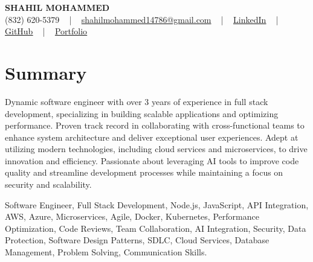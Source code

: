 \documentclass[letterpaper,10pt]{article}
\begin{document}
\begin{center}
    {\fontsize{14pt}{12pt}\selectfont \textbf{\MakeUppercase{Shahil Mohammed}}}\\ \vspace{2pt}
    \fontsize{10pt}{12pt}\selectfont (832) 620-5379 ~ | ~ \href{mailto:shahilmohammed14786@gmail.com}{shahilmohammed14786@gmail.com} ~ | ~  
    \href{https://www.linkedin.com/in/shahil-mohammed-9652931a1/}{\color{blue}\underline{LinkedIn}}  ~ | ~ 
    \href{https://github.com/freakbeast14}{\color{blue}\underline{GitHub}} ~ | ~ 
    \href{https://shahil-mohammed.netlify.app/}{\color{blue}\underline{Portfolio}}
    \vspace{-8pt}
\end{center}

\section{Summary}
\vspace{-2pt}\fontsize{8pt}{9pt}\selectfont
Dynamic software engineer with over 3 years of experience in full stack development, specializing in building scalable applications and optimizing performance. Proven track record in collaborating with cross-functional teams to enhance system architecture and deliver exceptional user experiences. Adept at utilizing modern technologies, including cloud services and microservices, to drive innovation and efficiency. Passionate about leveraging AI tools to improve code quality and streamline development processes while maintaining a focus on security and scalability.
 \vspace{-5pt}
 
{\fontsize{1pt}{1pt}\selectfont\color{white}
Software Engineer, Full Stack Development, Node.js, JavaScript, API Integration, AWS, Azure, Microservices, Agile, Docker, Kubernetes, Performance Optimization, Code Reviews, Team Collaboration, AI Integration, Security, Data Protection, Software Design Patterns, SDLC, Cloud Services, Database Management, Problem Solving, Communication Skills.
}
\vspace{-8pt}

\vspace{-2pt}
\end{document}
